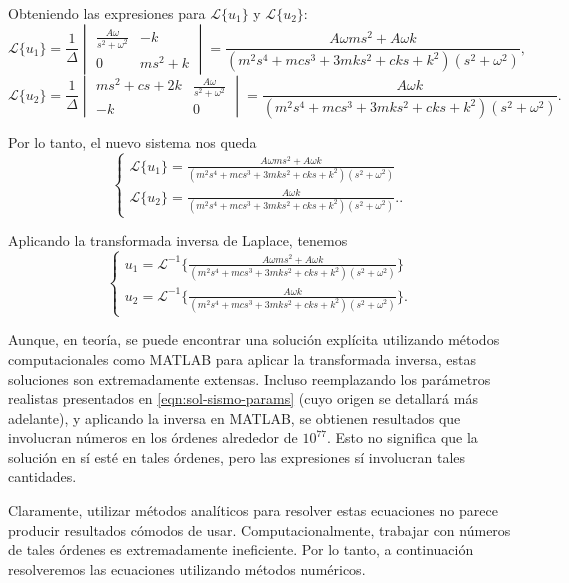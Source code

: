 Obteniendo las expresiones para \(\mathcal{L}\{u_1\}\) y \(\mathcal{L}\{u_2\}\):
\[
    \mathcal{L}\{u_1\} =
    \frac{1}{\Delta} \begin{vmatrix}
        \frac{A\omega}{s^2+\omega^2} & -k \\
        0 & ms^2+k
    \end{vmatrix}
    = \frac{A\omega ms^2+A\omega k}{(m^2s^4+mcs^3+3mks^2+cks+k^2)(s^2+\omega^2)}
,\]
\[
    \mathcal{L}\{u_2\} =
    \frac{1}{\Delta} \begin{vmatrix}
        ms^2 + cs + 2k & \frac{A\omega}{s^2 + \omega^2} \\
        -k & 0
    \end{vmatrix}
    = \frac{A\omega k}{(m^2s^4+mcs^3+3mks^2+cks+k^2)(s^2+\omega^2)}
.\]

Por lo tanto, el nuevo sistema nos queda
\[
    \begin{cases}
        \mathcal{L}\{u_1\} = \frac{A\omega ms^2+A\omega k}{(m^2s^4+mcs^3+3mks^2+cks+k^2)(s^2+\omega^2)} \\
        \mathcal{L}\{u_2\} = \frac{A\omega k}{(m^2s^4+mcs^3+3mks^2+cks+k^2)(s^2+\omega^2)}.
    .\end{cases}
\]

Aplicando la transformada inversa de Laplace, tenemos
\[
    \begin{cases}
        u_1 = \mathcal{L}^{-1}\{\frac{A\omega ms^2+A\omega k}{(m^2s^4+mcs^3+3mks^2+cks+k^2)(s^2+\omega^2)}\} \\
        u_2 = \mathcal{L}^{-1}\{\frac{A\omega k}{(m^2s^4+mcs^3+3mks^2+cks+k^2)(s^2+\omega^2)}\}
    .\end{cases}
\]

Aunque, en teoría, se puede encontrar una solución explícita utilizando métodos computacionales como MATLAB para aplicar la transformada inversa, estas soluciones son extremadamente extensas. Incluso reemplazando los parámetros realistas presentados en \eqref{eqn:sol-sismo-params} (cuyo origen se detallará más adelante), y aplicando la inversa en MATLAB, se obtienen resultados que involucran números en los órdenes alrededor de \(10^{77}\). Esto no significa que la solución en sí esté en tales órdenes, pero las expresiones sí involucran tales cantidades.

Claramente, utilizar métodos analíticos para resolver estas ecuaciones no parece producir resultados cómodos de usar. Computacionalmente, trabajar con números de tales órdenes es extremadamente ineficiente. Por lo tanto, a continuación resolveremos las ecuaciones utilizando métodos numéricos.


